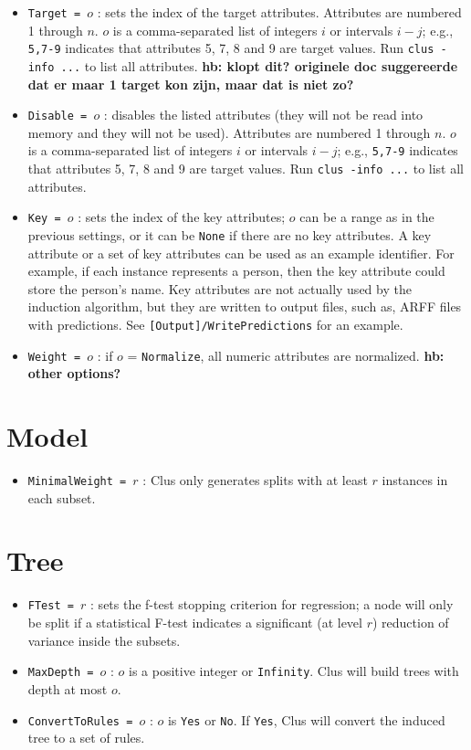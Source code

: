 \documentclass[a4paper]{report}
\begin{document}
\begin{itemize}
\item {\tt Target = $o$} : sets the index of the target attributes.  Attributes are numbered 1 through $n$.  $o$ is a comma-separated list of integers $i$ or intervals $i-j$; e.g., {\tt 5,7-9} indicates that attributes 5, 7, 8 and 9 are target values.  Run {\tt clus -info ...} to list all attributes.
{\bf * hb: klopt dit? originele doc suggereerde dat er maar 1 target kon zijn, maar dat is niet zo?}
\item {\tt Disable = $o$} : disables the listed attributes (they will not be read into memory and they will not be used).  Attributes are numbered 1 through $n$.  $o$ is a comma-separated list of integers $i$ or intervals $i-j$; e.g., {\tt 5,7-9} indicates that attributes 5, 7, 8 and 9 are target values.  Run {\tt clus -info ...} to list all attributes.
\item {\tt Key = $o$} : sets the index of the key attributes; $o$ can be a range as in the previous settings, or it can be {\tt None} if there are no key attributes. A key attribute or a set of key attributes can be used as an example identifier. For example, if each instance represents a person, then the key attribute could store the person's name. Key attributes are not actually used by the induction algorithm, but they are written to output files, such as, ARFF files with predictions. See \texttt{[Output]/WritePredictions} for an example.

\item {\tt Weight = $o$} : if $o$ = {\tt Normalize}, all numeric attributes are normalized.
   {\bf * hb: other options?}
\end{itemize}

\section{Model}

\begin{itemize}
\item {\tt MinimalWeight = $r$} : Clus only generates splits with at least $r$ instances in each subset.
\end{itemize}

\section{Tree}

\begin{itemize}
\item {\tt FTest = $r$} : sets the f-test stopping criterion for regression; a node will only be split if a statistical F-test indicates a significant (at level $r$) reduction of variance inside the subsets.
\item {\tt MaxDepth = $o$} : $o$ is a positive integer or {\tt Infinity}.  Clus will build trees with depth at  most $o$.
\item {\tt ConvertToRules = $o$} : $o$ is {\tt Yes} or {\tt No}.  If {\tt Yes},  Clus will convert the induced tree to a set of rules.
\end{itemize}
\end{document}
